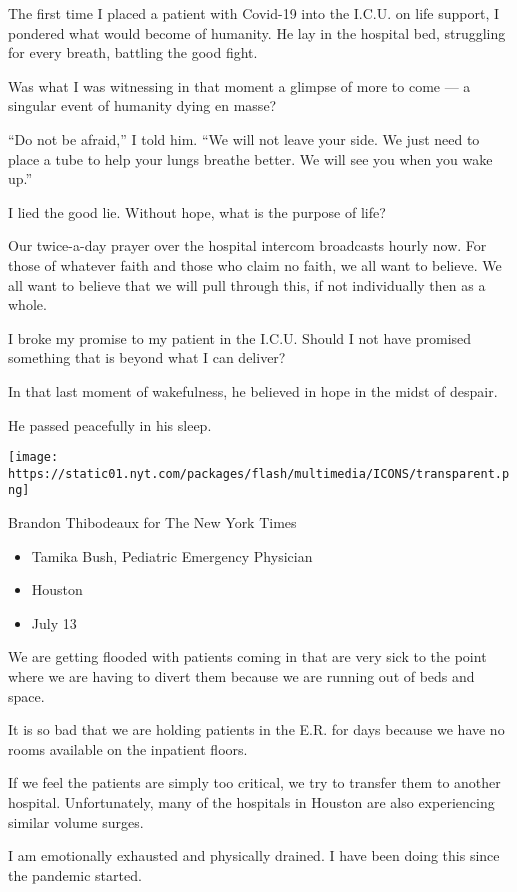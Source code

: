 The first time I placed a patient with Covid-19 into the I.C.U. on life
support, I pondered what would become of humanity. He lay in the
hospital bed, struggling for every breath, battling the good fight.

Was what I was witnessing in that moment a glimpse of more to come --- a
singular event of humanity dying en masse?

``Do not be afraid,'' I told him. ``We will not leave your side. We just
need to place a tube to help your lungs breathe better. We will see you
when you wake up.''

I lied the good lie. Without hope, what is the purpose of life?

Our twice-a-day prayer over the hospital intercom broadcasts hourly now.
For those of whatever faith and those who claim no faith, we all want to
believe. We all want to believe that we will pull through this, if not
individually then as a whole.

I broke my promise to my patient in the I.C.U. Should I not have
promised something that is beyond what I can deliver?

In that last moment of wakefulness, he believed in hope in the midst of
despair.

He passed peacefully in his sleep.

\texttt{[image: https://static01.nyt.com/packages/flash/multimedia/ICONS/transparent.png]}

Brandon Thibodeaux for The New York Times

\begin{itemize}
\tightlist
\item
  Tamika Bush, Pediatric Emergency Physician
\item
  Houston
\item
  July 13
\end{itemize}

We are getting flooded with patients coming in that are very sick to the
point where we are having to divert them because we are running out of
beds and space.

It is so bad that we are holding patients in the E.R. for days because
we have no rooms available on the inpatient floors.

If we feel the patients are simply too critical, we try to transfer them
to another hospital. Unfortunately, many of the hospitals in Houston are
also experiencing similar volume surges.

I am emotionally exhausted and physically drained. I have been doing
this since the pandemic started.

